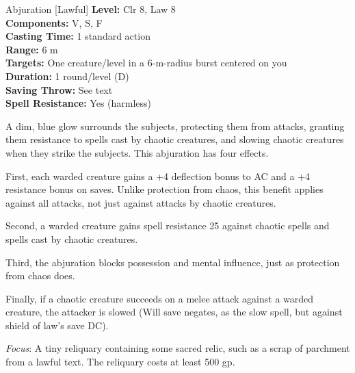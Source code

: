 {Abjuration [Lawful]}
{
	\textbf{Level:}
	Clr 8, Law 8\\
	\textbf{Components:}
	V, S, F\\
	\textbf{Casting Time:}
	1 standard action\\
	\textbf{Range:}
	6 m\\
	\textbf{Targets:}
	One creature/level in a 6-m-radius burst centered on you\\
	\textbf{Duration:}
	1 round/level (D)\\
	\textbf{Saving Throw:}
	See text\\
	\textbf{Spell Resistance:}
	Yes (harmless)\\
}
{
	A dim, blue glow surrounds the subjects, protecting them from attacks, granting them resistance to spells cast by chaotic creatures, and slowing chaotic creatures when they strike the subjects. This abjuration has four effects.

	First, each warded creature gains a +4 deflection bonus to AC and a +4 resistance bonus on saves. Unlike protection from chaos, this benefit applies against all attacks, not just against attacks by chaotic creatures.

	Second, a warded creature gains spell resistance 25 against chaotic spells and spells cast by chaotic creatures.

	Third, the abjuration blocks possession and mental influence, just as protection from chaos does.

	Finally, if a chaotic creature succeeds on a melee attack against a warded creature, the attacker is slowed (Will save negates, as the slow spell, but against shield of law's save DC).

	\textit{Focus}:
	A tiny reliquary containing some sacred relic, such as a scrap of parchment from a lawful text. The reliquary costs at least 500 gp.

}
